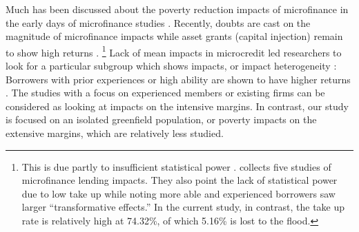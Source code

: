 	Much has been discussed about the poverty reduction impacts of microfinance in the early days of microfinance studies \citep{PittKhandker1998, Morduch1999}. Recently, doubts are cast on the magnitude of microfinance impacts \citep{BanerjeeKarlanZinman2015, DuvendackMader2019, Meager2019} while asset grants (capital injection) remain to show high returns \citep{deMel2008, DeMel2014, FafchampsFlypaper2014, BandieraBRAC2017}. \footnote{This is due partly to insufficient statistical power \citep{MckenzieWoodruff2013}. \citet{BanerjeeKarlanZinman2015} collects five studies of microfinance lending impacts. They also point the lack of statistical power due to low take up while noting more able and experienced borrowers saw larger ``transformative effects.'' %
	In the current study, in contrast, the take up rate is relatively high at 74.32\%, of which 5.16\% is lost to the flood.  } Lack of mean impacts in microcredit led researchers to look for a particular subgroup which shows impacts, or impact heterogeneity \citep{Banerjee2017HyderabadFollowup}: Borrowers with prior experiences or high ability are shown to have higher returns \citep{Banerjee2015Miracle, Mckenzie2017Spurring, Buera2017, Banerjee2019MFPovertyTrap}. The studies with a focus on experienced members or existing firms can be considered as looking at impacts on the intensive margins. In contrast, our study is focused on an isolated greenfield population, or poverty impacts on the extensive margins, which are relatively less studied.

